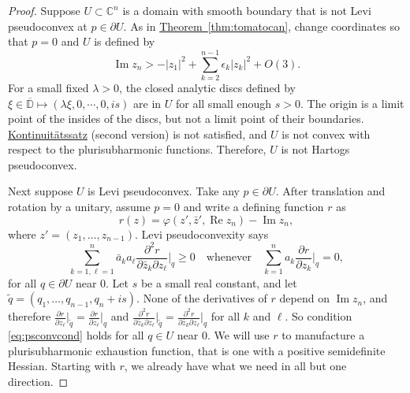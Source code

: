 \documentclass[12pt,openany]{book}
\renewcommand{\Re}{\operatorname{Re}}
\renewcommand{\Im}{\operatorname{Im}}
\newcommand{\sabs}[1]{\lvert {#1} \rvert}
\newcommand{\C}{{\mathbb{C}}}
\newcommand{\D}{{\mathbb{D}}}
\theoremstyle{plain}
\theoremstyle{remark}
\theoremstyle{definition}
\theoremstyle{exercise}
\theoremstyle{example}
\newcommand{\thmref}[1]{\hyperref[#1]{Theorem~\ref*{#1}}}
\begin{document}
\begin{proof}
Suppose
$U \subset \C^n$ is a domain with smooth boundary that is not
Levi pseudoconvex at $p \in \partial U$.
As in
\thmref{thm:tomatocan}, change coordinates so that $p=0$ and $U$ is defined
by
\begin{equation*}
\Im z_n > - \sabs{z_1}^2 + \sum_{k=2}^{n-1} \epsilon_k \sabs{z_k}^2 + O(3) .
\end{equation*}
For a small fixed $\lambda > 0$, the
closed analytic discs defined by $\xi \in \overline{\D} \mapsto (\lambda \xi, 0, \cdots, 0, is)$
are in $U$ for all small enough $s > 0$.  The origin
is a limit point of the insides of the discs, but not a limit point of their boundaries.
\hyperref[thm:contprinciple2]{Kontinuit\"atssatz} (second version) is not satisfied,
and $U$ is not
convex with respect to the plurisubharmonic functions.  Therefore,
$U$ is not Hartogs pseudoconvex.

Next suppose $U$ is Levi pseudoconvex.  Take any $p \in \partial U$.
After translation and rotation by a unitary, assume $p=0$ and
write a defining function $r$ as
\begin{equation*}
r(z) = \varphi(z',\bar{z}',\Re z_n) - \Im z_n ,
\end{equation*}
where $z' = (z_1,\ldots,z_{n-1})$.
Levi pseudoconvexity says
\begin{equation} \label{eq:psconvcond}
\sum_{k=1,\ell=1}^n
\bar{a}_k a_\ell \frac{\partial^2 r}{\partial \bar{z}_k \partial z_\ell} \Big|_q \geq 0
\quad \text{whenever} \quad
\sum_{k=1}^n
a_k \frac{\partial r}{\partial z_k} \Big|_q = 0 ,
\end{equation}
for all $q \in \partial U$ near $0$.
Let $s$ be a small real constant,
and let $\widetilde{q} = (q_1,\ldots,q_{n-1},q_n + is)$.
None of the derivatives of $r$ depend on $\Im z_n$, and therefore
$\frac{\partial r}{\partial z_\ell} \big|_{\widetilde{q}} =
\frac{\partial r}{\partial z_\ell} \big|_{q}$ and
$\frac{\partial^2 r}{\partial \bar{z}_k \partial z_\ell} \big|_{\widetilde{q}} =
\frac{\partial^2 r}{\partial \bar{z}_k \partial z_\ell} \big|_{q}$
for all $k$ and $\ell$.
So condition \eqref{eq:psconvcond} holds for all $q \in U$ near $0$.
We will use $r$ to manufacture a plurisubharmonic exhaustion function, that
is one with a positive semidefinite Hessian.
Starting with $r$, we already
have what we need in all but one direction.


\end{proof}
\end{document}
